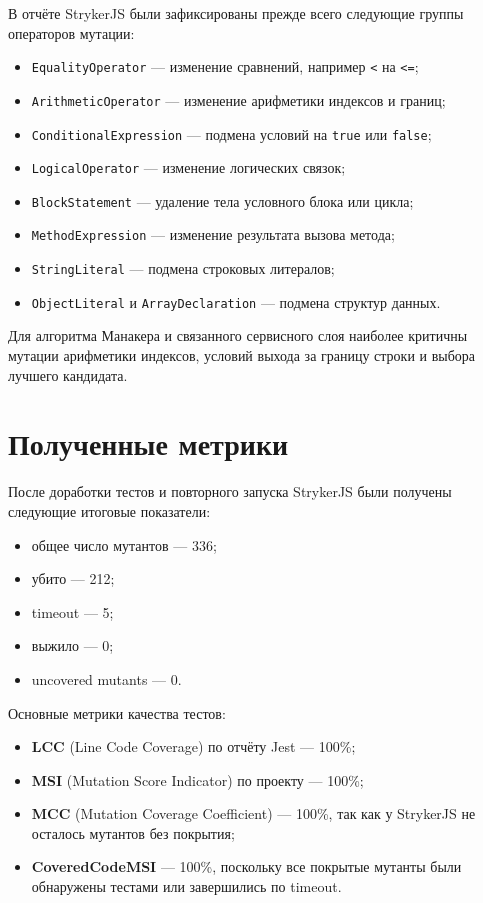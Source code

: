 В отчёте StrykerJS были зафиксированы прежде всего следующие группы операторов мутации:
\begin{itemize}
    \item \texttt{EqualityOperator} --- изменение сравнений, например \texttt{<} на \texttt{<=};
    \item \texttt{ArithmeticOperator} --- изменение арифметики индексов и границ;
    \item \texttt{ConditionalExpression} --- подмена условий на \texttt{true} или \texttt{false};
    \item \texttt{LogicalOperator} --- изменение логических связок;
    \item \texttt{BlockStatement} --- удаление тела условного блока или цикла;
    \item \texttt{MethodExpression} --- изменение результата вызова метода;
    \item \texttt{StringLiteral} --- подмена строковых литералов;
    \item \texttt{ObjectLiteral} и \texttt{ArrayDeclaration} --- подмена структур данных.
\end{itemize}

Для алгоритма Манакера и связанного сервисного слоя наиболее критичны мутации арифметики индексов, условий выхода за границу строки и выбора лучшего кандидата.

\section{Полученные метрики} \label{ch6:sec4}

После доработки тестов и повторного запуска StrykerJS были получены следующие итоговые показатели:
\begin{itemize}
    \item общее число мутантов --- 336;
    \item убито --- 212;
    \item timeout --- 5;
    \item выжило --- 0;
    \item uncovered mutants --- 0.
\end{itemize}

Основные метрики качества тестов:
\begin{itemize}
    \item \textbf{LCC} (Line Code Coverage) по отчёту Jest --- 100\%;
    \item \textbf{MSI} (Mutation Score Indicator) по проекту --- 100\%;
    \item \textbf{MCC} (Mutation Coverage Coefficient) --- 100\%, так как у StrykerJS не осталось мутантов без покрытия;
    \item \textbf{CoveredCodeMSI} --- 100\%, поскольку все покрытые мутанты были обнаружены тестами или завершились по timeout.
\end{itemize}

